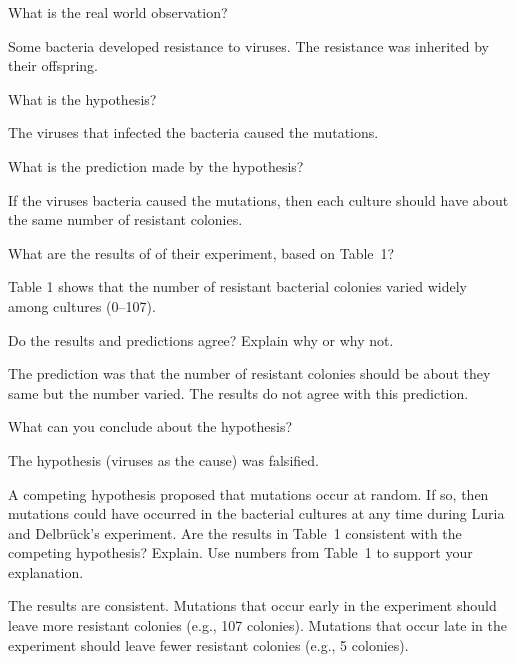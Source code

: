 \documentclass[12pt]{exam}
\newcommand*\AnswerBox[2]{%
    \parbox[t][#1]{0.92\textwidth}{%
    \begin{solution}#2\end{solution}}
    \vspace*{\stretch{1}}
}
\begin{document}
\begin{questions}

\question
What is the real world observation?

\AnswerBox{4\baselineskip}{%
Some bacteria developed resistance to viruses. The resistance
was inherited by their offspring.}

\question
What is the hypothesis?

\AnswerBox{4\baselineskip}{%
The viruses that infected the bacteria caused the mutations.}

\newpage

\question
What is the prediction made by the hypothesis?

\AnswerBox{4\baselineskip}{%
If the viruses bacteria caused the mutations, then each 
	culture should have about the same number of resistant colonies.}


\question
What are the results of of their experiment, based on Table~1?

\AnswerBox{4\baselineskip}{%
Table 1 shows that the number of resistant bacterial colonies varied widely among cultures (0--107).}

\question
Do the results and predictions agree? Explain why or why not.

\AnswerBox{4\baselineskip}{%
The prediction was that the number of resistant colonies should
be about they same but the number varied. The results do not agree 
with this prediction. }

\question
What can you conclude about the hypothesis?

\AnswerBox{4\baselineskip}{%
The hypothesis (viruses as the cause) was falsified.
}

\question[Checkout]
A competing hypothesis proposed that mutations occur at random. If so, then mutations could have occurred in the bacterial cultures at any time during Luria and Delbrück's experiment. Are the results in Table~1 consistent with the competing hypothesis? Explain. Use numbers from Table~1 to support your explanation.

\AnswerBox{5\baselineskip}{%
The results are consistent. Mutations that occur early in the experiment should leave more resistant colonies (e.g., 107 colonies). Mutations that occur late in the experiment should leave fewer resistant colonies (e.g., 5 colonies).}

\end{questions}
\end{document}
